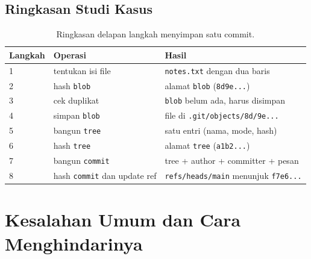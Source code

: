 \documentclass[11pt,a4paper]{article}
\begin{document}
\subsection{Ringkasan Studi Kasus}

\begin{table}[H]
	\centering
	\caption{Ringkasan delapan langkah menyimpan satu commit.}
	\label{tab:case-summary}
	\footnotesize
	\begin{tabularx}{\textwidth}{l X X}
		\toprule
		Langkah & Operasi                             & Hasil                                              \\
		\midrule
		1       & tentukan isi file                   & \texttt{notes.txt} dengan dua baris                \\
		2       & hash \texttt{blob}                  & alamat \texttt{blob} (\texttt{8d9e...})            \\
		3       & cek duplikat                        & \texttt{blob} belum ada, harus disimpan            \\
		4       & simpan \texttt{blob}                & file di \texttt{.git/objects/8d/9e...}             \\
		5       & bangun \texttt{tree}                & satu entri (nama, mode, hash)                      \\
		6       & hash \texttt{tree}                  & alamat \texttt{tree} (\texttt{a1b2...})            \\
		7       & bangun \texttt{commit}              & tree + author + committer + pesan                  \\
		8       & hash \texttt{commit} dan update ref & \texttt{refs/heads/main} menunjuk \texttt{f7e6...} \\
		\bottomrule
	\end{tabularx}
\end{table}

\section{Kesalahan Umum dan Cara Menghindarinya}
\end{document}
